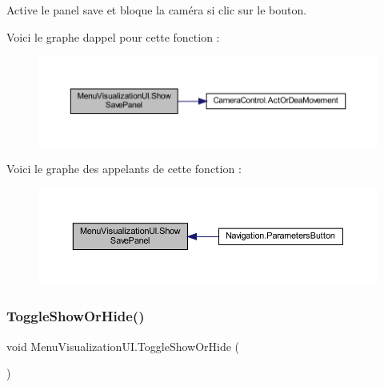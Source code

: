Active le panel save et bloque la caméra si clic sur le bouton. 

Voici le graphe d\textquotesingle{}appel pour cette fonction \+:
\nopagebreak
\begin{figure}[H]
\begin{center}
\leavevmode
\includegraphics[width=350pt]{class_menu_visualization_u_i_aabfef8a72ef59e04916f6d95a1274431_cgraph}
\end{center}
\end{figure}
Voici le graphe des appelants de cette fonction \+:
\nopagebreak
\begin{figure}[H]
\begin{center}
\leavevmode
\includegraphics[width=350pt]{class_menu_visualization_u_i_aabfef8a72ef59e04916f6d95a1274431_icgraph}
\end{center}
\end{figure}
\mbox{\label{class_menu_visualization_u_i_acc1ed888dd19359811e473ffbd2fa86a}} 
\subsubsection{\texorpdfstring{Toggle\+Show\+Or\+Hide()}{ToggleShowOrHide()}}
{\footnotesize\ttfamily void Menu\+Visualization\+U\+I.\+Toggle\+Show\+Or\+Hide (\begin{DoxyParamCaption}{ }\end{DoxyParamCaption})\hspace{0.3cm}{\ttfamily [inline]}}



